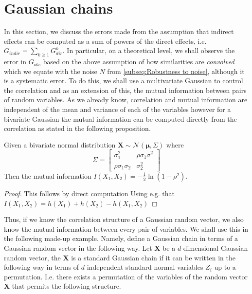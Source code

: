\documentclass[../Thesis.tex]{subfiles}
\begin{document}
\section{Gaussian chains}\label{sec:Gaussian chains general}
In this section, we discuss the errors made from the assumption that indirect effects can be computed as a sum of powers of the direct effects, i.e. $G_{indir} = \sum_{k\geq 1} G_{dir}^k$. In particular, on a theoretical level, we shall observe the error in $G_{obs}$ based on the above assumption of how similarities are \textit{convolved} which we equate with the noise $N$ from \autoref{subseq:Robustness to noise}, although it is a systematic error. To do this, we shall use a multivariate Gaussian to control the correlation and as an extension of this, the mutual information between pairs of random variables. As we already know, correlation and mutual information are independent of the mean and variance of each of the variables however for a bivariate Gaussian the mutual information can be computed directly from the correlation as stated in the following proposition.
\begin{proposition}\label{prop:MI bivariate gaussian}
    Given a bivariate normal distribution $\boldsymbol X \sim \mathcal{N}\left(\boldsymbol \mu,  \Sigma\right)$ where
    $$\Sigma =
        \begin{bmatrix}
            \sigma_1^2             & \rho \sigma_1 \sigma^2 \\
            \rho \sigma_1 \sigma_2 & \sigma_2^2
        \end{bmatrix}
    $$
    Then the mutual information $I\left(X_1, X_2\right) = -\frac{1}{2}\ln \left(1 - \rho^2\right)$.
\end{proposition}
\begin{proof}
    This follows by direct computation Using e.g. that $I(X_1, X_2) = h(X_1) + h(X_2) - h(X_1, X_2)$
\end{proof}
Thus, if we know the correlation structure of a Gaussian random vector, we also know the mutual information between every pair of variables. We shall use this in the following made-up example. Namely, define a Gaussian chain in terms of a Gaussian random vector in the following way. Let $\boldsymbol X$ be a $d$-dimensional Gaussian random vector, the $\boldsymbol X$ is a standard Gaussian chain if it can be written in the following way in terms of $d$ independent standard normal variables $Z_i$ up to a permutation. I.e. there exists a permutation of the variables of the random vector $\boldsymbol X$ that permits the following structure.
\end{document}
